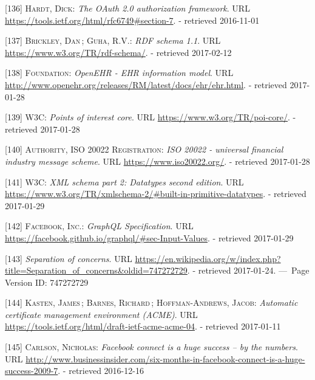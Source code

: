 \documentclass[12pt,english,a4paper,titlepage,cleardoublepage=empty,dottedtoc]{report}
\begin{document}
\hypertarget{ref-web_spec_oauth-2_access-verification}{}
{[}136{]} \textsc{Hardt, Dick}: \emph{The OAuth 2.0 authorization
framework}. URL \url{https://tools.ietf.org/html/rfc6749\#section-7}. -
retrieved 2016-11-01

\hypertarget{ref-web_w3c-tr_rdf-schemas}{}
{[}137{]} \textsc{Brickley, Dan}\,; \textsc{Guha, R.V.}: \emph{RDF
schema 1.1}. URL \url{https://www.w3.org/TR/rdf-schema/}. - retrieved
2017-02-12

\hypertarget{ref-web_spec_data-schemas_ehr}{}
{[}138{]} \textsc{Foundation}: \emph{OpenEHR - EHR information model}.
URL \url{http://www.openehr.org/releases/RM/latest/docs/ehr/ehr.html}. -
retrieved 2017-01-28

\hypertarget{ref-web_spec_data-schemas_poi}{}
{[}139{]} \textsc{W3C}: \emph{Points of interest core}. URL
\url{https://www.w3.org/TR/poi-core/}. - retrieved 2017-01-28

\hypertarget{ref-web_spec_data-schemas_bank-transfer}{}
{[}140{]} \textsc{Authority, ISO 20022 Registration}: \emph{ISO 20022 -
universal financial industry message scheme}. URL
\url{https://www.iso20022.org/}. - retrieved 2017-01-28

\hypertarget{ref-web_spec_xml_types}{}
{[}141{]} \textsc{W3C}: \emph{XML schema part 2: Datatypes second
edition}. URL
\url{https://www.w3.org/TR/xmlschema-2/\#built-in-primitive-datatypes}.
- retrieved 2017-01-29

\hypertarget{ref-web_spec_graphql_types}{}
{[}142{]} \textsc{Facebook, Inc.}: \emph{GraphQL Specification}. URL
\url{https://facebook.github.io/graphql/\#sec-Input-Values}. - retrieved
2017-01-29

\hypertarget{ref-web_2016_wikipedia_separation-of-concerns}{}
{[}143{]} \emph{Separation of concerns}. URL
\url{https://en.wikipedia.org/w/index.php?title=Separation_of_concerns\&oldid=747272729}.
- retrieved 2017-01-24. ---~Page Version ID: 747272729

\hypertarget{ref-web_spec_acme}{}
{[}144{]} \textsc{Kasten, James}\,; \textsc{Barnes, Richard}\,;
\textsc{Hoffman-Andrews, Jacob}: \emph{Automatic certificate management
environment (ACME)}. URL
\url{https://tools.ietf.org/html/draft-ietf-acme-acme-04}. - retrieved
2017-01-11

\hypertarget{ref-web_2009-success-of-facebook-connect}{}
{[}145{]} \textsc{Carlson, Nicholas}: \emph{Facebook connect is a huge
success -- by the numbers}. URL
\url{http://www.businessinsider.com/six-months-in-facebook-connect-is-a-huge-success-2009-7}.
- retrieved 2016-12-16
\end{document}
